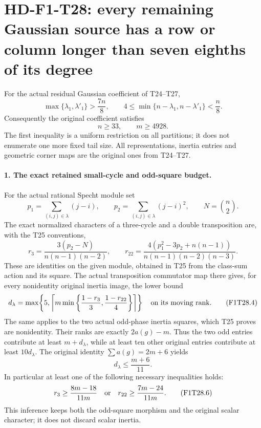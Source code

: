 \section[HD-F1-T28: every remaining Gaussian partition has a long row or column]{HD-F1-T28: every remaining Gaussian source has a row or column longer than seven eighths of its degree}
\label{sec:f1-gaussian-near-row}

For the actual residual Gaussian coefficient of T24--T27,
\[
 \max\{\lambda_1,\lambda'_1\}>\frac{7n}{8},\qquad
 4\le\min\{n-\lambda_1,n-\lambda'_1\}<\frac n8.
 \tag{F1T28.1}
\]
Consequently the original coefficient satisfies
\[
                         n\ge33,\qquad m\ge4928.
 \tag{F1T28.2}
\]
The first inequality is a uniform restriction on all partitions;
it does not enumerate one more fixed tail size.
All representations, inertia entries and geometric corner maps
are the original ones from T24--T27.

\paragraph{1. The exact retained small-cycle and odd-square budget.}
For the actual rational Specht module set
\[
 p_1=\sum_{(i,j)\in\lambda}(j-i),\qquad
 p_2=\sum_{(i,j)\in\lambda}(j-i)^2,\qquad
 N=\binom n2.
\]
The exact normalized characters of a three-cycle and a double
transposition are, with the T25 conventions,
\[
 r_3=\frac{3(p_2-N)}{n(n-1)(n-2)},\qquad
 r_{22}=\frac{4(p_1^2-3p_2+n(n-1))}
                    {n(n-1)(n-2)(n-3)}.
 \tag{F1T28.3}
\]
These are identities on the given module, obtained in T25 from
the class-sum action and its square. The actual transposition
commutator map there gives, for every nonidentity original
inertia image, the lower bound
\[
 d_\lambda=
 \max\!\left\{5,\left\lceil
 m\min\left\{\frac{1-r_3}{3},\frac{1-r_{22}}4\right\}
                           \right\rceil\right\}
 \quad\hbox{on its moving rank}.
 \tag{F1T28.4}
\]
The same applies to the two actual odd-phase inertia squares,
which T25 proves are nonidentity. Their ranks are exactly
$2a(g)-m$. Thus the two odd entries contribute at least
$m+d_\lambda$, while at least ten other original entries
contribute at least $10d_\lambda$. The original identity
$\sum a(g)=2m+6$ yields
\[
 d_\lambda\le\frac{m+6}{11}.
 \tag{F1T28.5}
\]
In particular at least one of the following necessary inequalities
holds:
\[
 r_3\ge\frac{8m-18}{11m}
 \quad\hbox{or}\quad
 r_{22}\ge\frac{7m-24}{11m}.
 \tag{F1T28.6}
\]
This inference keeps both the odd-square morphism and the
original scalar character; it does not discard scalar inertia.

